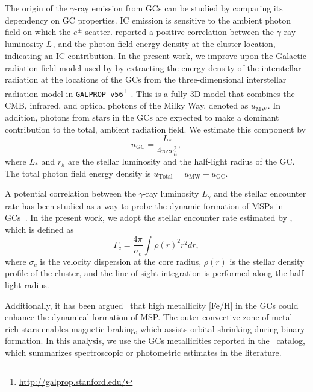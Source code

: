 \documentclass[doublespace,nopageskip]{VTthesis} %
\begin{document}
The origin of the $\gamma$-ray emission from GCs can be studied by comparing its dependency on GC properties. IC emission is sensitive to the ambient photon field on which the $e^\pm$ scatter. \citet{2011ApJ...726..100H} reported a positive correlation between the $\gamma$-ray luminosity $L_\gamma$ and the photon field energy density at the cluster location, indicating an IC contribution. In the present work, we improve upon the Galactic radiation field model used by \citet{2011ApJ...726..100H} by extracting the energy density of the interstellar radiation at the locations of the GCs from the three-dimensional interstellar radiation model in \texttt{GALPROP v56}\footnote{\url{http://galprop.stanford.edu/}}~\citep{2017ApJ...846...67P,2018ApJ...856...45J}. This is a fully 3D model that combines the CMB, infrared, and optical photons of the Milky Way, denoted as $u_\text{MW}$. In addition, photons from stars in the GCs are expected to make a dominant contribution to the total, ambient radiation field. We estimate this component by
\begin{equation}
    u_{\text{GC}} = \dfrac{L_*}{4\pi c r_h^2},
    \label{eq:GCRF}
\end{equation}
where $L_*$ and $r_h$ are the stellar luminosity and the half-light radius of the GC. The total photon field energy density is $u_\text{Total} = u_\text{MW} + u_\text{GC}$.

A potential correlation between the $\gamma$-ray luminosity $L_\gamma$ and the stellar encounter rate has been studied as a way to probe the dynamic formation of MSPs in GCs~\citep{2010A&A...524A..75A,2011ApJ...726..100H,2019MNRAS.486..851D}. In the present work, we adopt the stellar encounter rate estimated by \citet{2013ApJ...766..136B}, which is defined as
\begin{equation}
    \Gamma_c = \frac{4\pi}{\sigma_c}\int\rho(r)^2 r^2dr,
	\label{eq:encounter}
\end{equation}
where $\sigma_c$ is the velocity dispersion at the core radius, $\rho(r)$ is the stellar density profile of the cluster, and the line-of-sight integration is performed along the half-light radius. 

Additionally, it has been argued~\citep{2011ApJ...726..100H,2019MNRAS.486..851D} that high metallicity [Fe/H] in the GCs could enhance the dynamical formation of MSP. The outer convective zone of metal-rich stars enables magnetic braking, which assists orbital shrinking during binary formation. In this analysis, we use the GCs metallicities  reported in the~\citet{1996AJ....112.1487H} catalog, which summarizes  spectroscopic or photometric estimates in the literature.
\end{document}
